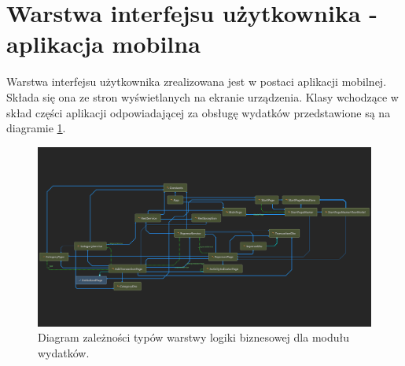 \section{Warstwa interfejsu użytkownika - aplikacja mobilna}
Warstwa interfejsu użytkownika zrealizowana jest w postaci aplikacji mobilnej. Składa się ona ze stron wyświetlanych na ekranie urządzenia. Klasy wchodzące w skład części aplikacji odpowiadającej za obsługę wydatków przedstawione są na diagramie \ref{xamarinexpenses}.
\begin{figure}[!ht]
	\begin{center}
		\includegraphics[width=6in]{img/diagram/interface_diagram.png}
		\caption{Diagram zależności typów warstwy logiki biznesowej dla modułu wydatków.}
		\label{xamarinexpenses}
	\end{center}
\end{figure}
